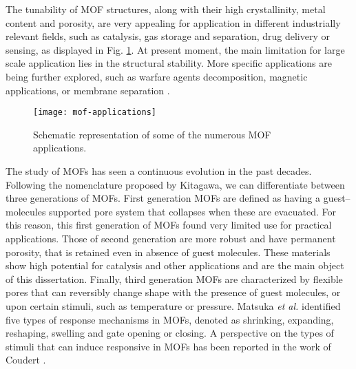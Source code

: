\npar
The tunability of MOF structures, along with their high crystallinity, metal content and porosity, are very appealing for application in different industrially relevant fields, such as catalysis, gas storage and separation, drug delivery or sensing, as displayed in Fig. \ref{fig:mof-applications}. At present moment, the main limitation for large scale application lies in the structural stability. More specific applications are being further explored, such as warfare agents decomposition, magnetic applications, or membrane separation \cite{furukawa2013chemistry}.
%
%
\begin{figure}[htbp]
	\centering
 	\texttt{[image: mof-applications]}
	\caption{Schematic representation of some of the numerous MOF applications.}
	\label{fig:mof-applications}
\end{figure}
%
\npar
The study of MOFs has seen a continuous evolution in the past decades.
Following the nomenclature proposed by Kitagawa, we can differentiate between three generations of MOFs\cite{kitagawa1998functional}. First generation MOFs are defined as having a guest--molecules supported pore system that collapses when these are evacuated. For this reason, this first generation of MOFs found very limited use for practical applications. Those of second generation are more robust and have permanent porosity, that is retained even in absence of guest molecules. These materials show high potential for catalysis and other applications and are the main object of this dissertation. Finally, third generation MOFs are characterized by flexible pores that can reversibly change shape with the presence of guest molecules, or upon certain stimuli, such as temperature or pressure. Matsuka \textit{et al.}\cite{matsuda2004guest} identified five types of response mechanisms in MOFs, denoted as shrinking, expanding, reshaping, swelling and gate opening or closing. A perspective on the types of stimuli that can induce responsive in MOFs has been reported in the work of Coudert \cite{coudert2015responsive}.

